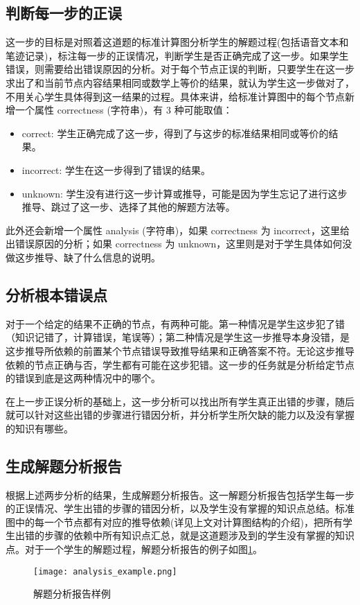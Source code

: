 \subsection*{判断每一步的正误}

这一步的目标是对照着这道题的标准计算图分析学生的解题过程(包括语音文本和笔迹记录)，标注每一步的正误情况，判断学生是否正确完成了这一步。如果学生错误，则需要给出错误原因的分析。对于每个节点正误的判断，只要学生在这一步求出了和当前节点内容结果相同或数学上等价的结果，就认为学生这一步做对了，不用关心学生具体得到这一结果的过程。具体来讲，给标准计算图中的每个节点新增一个属性 correctness (字符串)，有 3 种可能取值：

\begin{itemize}
    \item correct: 学生正确完成了这一步，得到了与这步的标准结果相同或等价的结果。
    \item incorrect: 学生在这一步得到了错误的结果。
    \item unknown: 学生没有进行这一步计算或推导，可能是因为学生忘记了进行这步推导、跳过了这一步、选择了其他的解题方法等。
\end{itemize}

此外还会新增一个属性 analysis (字符串)，如果 correctness 为 incorrect，这里给出错误原因的分析；如果 correctness 为 unknown，这里则是对于学生具体如何没做这步推导、缺了什么信息的说明。

\subsection*{分析根本错误点}

对于一个给定的结果不正确的节点，有两种可能。第一种情况是学生这步犯了错（知识记错了，计算错误，笔误等）；第二种情况是学生这一步推导本身没错，是这步推导所依赖的前置某个节点错误导致推导结果和正确答案不符。无论这步推导依赖的节点正确与否，学生都有可能在这步犯错。这一步的任务就是分析给定节点的错误到底是这两种情况中的哪个。

在上一步正误分析的基础上，这一步分析可以找出所有学生真正出错的步骤，随后就可以针对这些出错的步骤进行错因分析，并分析学生所欠缺的能力以及没有掌握的知识有哪些。

\subsection*{生成解题分析报告}

根据上述两步分析的结果，生成解题分析报告。这一解题分析报告包括学生每一步的正误情况、学生出错的步骤的错因分析，以及学生没有掌握的知识点总结。标准图中的每一个节点都有对应的推导依赖(详见上文对计算图结构的介绍)，把所有学生出错的步骤的依赖中所有知识点汇总，就是这道题涉及到的学生没有掌握的知识点。对于一个学生的解题过程，解题分析报告的例子如图\ref{fig:analysis_example}。

\begin{figure}
    \centering
    \texttt{[image: analysis\_example.png]}
    \caption{解题分析报告样例}
    \label{fig:analysis_example}
\end{figure}